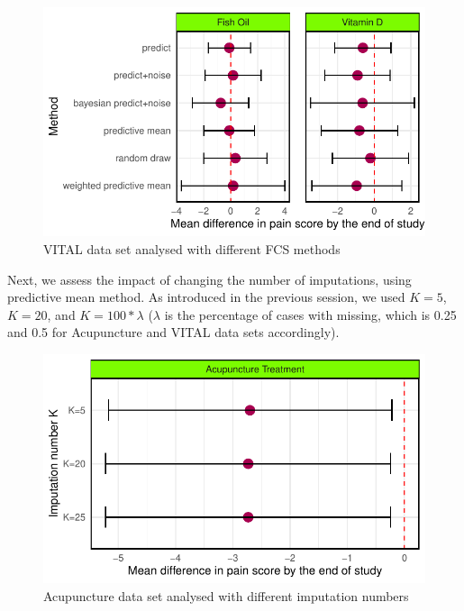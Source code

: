 \documentclass{article}
\newcommand{\pandocbounded}[1]{#1}
\begin{document}
\begin{figure}
\centering
\pandocbounded{\includegraphics[keepaspectratio]{Final_Report_files/figure-latex/unnamed-chunk-30-1.pdf}}
\caption{VITAL data set analysed with different FCS methods}
\end{figure}

Next, we assess the impact of changing the number of imputations, using
predictive mean method. As introduced in the previous session, we used
\(K=5\), \(K=20\), and \(K=100*\lambda\) (\(\lambda\) is the percentage
of cases with missing, which is 0.25 and 0.5 for Acupuncture and VITAL
data sets accordingly).

\begin{figure}
\centering
\pandocbounded{\includegraphics[keepaspectratio]{Final_Report_files/figure-latex/unnamed-chunk-31-1.pdf}}
\caption{Acupuncture data set analysed with different imputation
numbers}
\end{figure}
\end{document}

